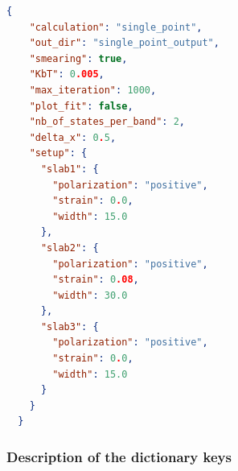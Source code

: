 \documentclass[a4paper,12pt]{article}
\begin{document}
\begin{lstlisting}[language=json,firstnumber=1]
  {   
    "calculation": "single_point", 
    "out_dir": "single_point_output", 
    "smearing": true, 
    "KbT": 0.005,
    "max_iteration": 1000, 
    "plot_fit": false, 
    "nb_of_states_per_band": 2, 
    "delta_x": 0.5, 
    "setup": {  
      "slab1": {  
        "polarization": "positive", 
        "strain": 0.0, 
        "width": 15.0
      }, 
      "slab2": { 
        "polarization": "positive", 
        "strain": 0.08, 
        "width": 30.0
      },
      "slab3": { 
        "polarization": "positive", 
        "strain": 0.0, 
        "width": 15.0
      }
    }
  }
\end{lstlisting}

\subsubsection*{Description of the dictionary keys}
\end{document}
